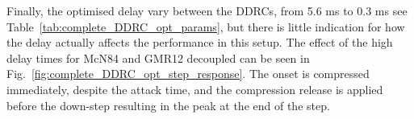 \documentclass[../main2.tex]{subfiles}
\begin{document}
Finally, the optimised delay vary between the DDRCs, from 5.6 ms to 0.3 ms see Table~\ref{tab:complete_DDRC_opt_params}, but there is little indication for how the delay actually affects the performance in this setup. The effect of the high delay times for McN84 and GMR12 decoupled can be seen in Fig.~\ref{fig:complete_DDRC_opt_step_response}. The onset is compressed immediately, despite the attack time, and the compression release is applied before the down-step resulting in the peak at the end of the step.

\end{document}
